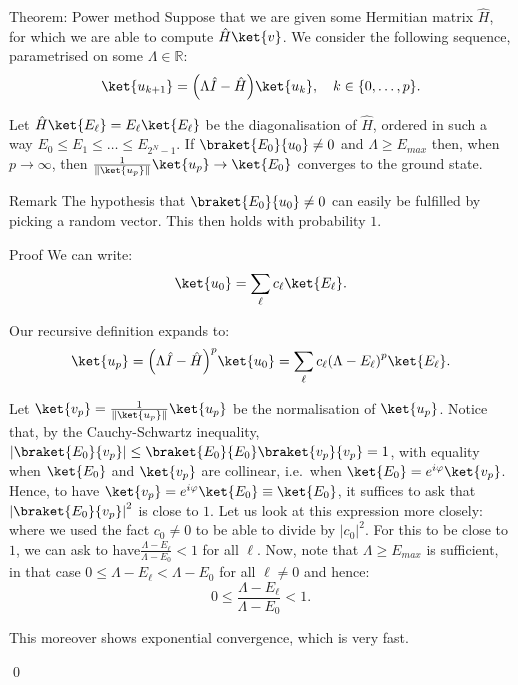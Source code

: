 \documentclass[a4paper]{article}
\begin{document}
\begin{parag}{Theorem: Power method}
    Suppose that we are given some Hermitian matrix $\hat{H}$, for which we are able to compute $\hat{H} \ket{v}$. We consider the following sequence, parametrised on some $\Lambda \in \mathbb{R}$: 
    \[\ket{u_{k+1}} = \left(\Lambda \hat{I} - \hat{H}\right) \ket{u_k}, \mathspace k \in \left\{0, \ldots, p\right\}.\]

    Let $\hat{H} \ket{E_{\ell}} = E_{\ell} \ket{E_{\ell}}$ be the diagonalisation of $\hat{H}$, ordered in such a way $E_0 \leq E_1 \leq \ldots \leq E_{2^N - 1}$. If $\braket{E_0}{u_0} \neq 0$ and $\Lambda \geq E_{max}$ then, when $p \to \infty$, then $\frac{1}{\left\|\ket{u_p}\right\|}\ket{u_p} \to \ket{E_0}$ converges to the ground state.

    \begin{subparag}{Remark}
        The hypothesis that $\braket{E_0}{u_0} \neq 0$ can easily be fulfilled by picking a random vector. This then holds with probability $1$.
    \end{subparag}

    \begin{subparag}{Proof}
        We can write: 
        \[\ket{u_0} = \sum_{\ell} c_{\ell} \ket{E_{\ell}}.\]
        
        Our recursive definition expands to: 
        \[\ket{u_p} = \left(\Lambda \hat{I} - \hat{H}\right)^p \ket{u_0} = \sum_{\ell} c_{\ell} \left(\Lambda - E_{\ell}\right)^p \ket{E_{\ell}}.\]
        
        Let $\ket{v_p} = \frac{1}{\left\|\ket{u_p}\right\|} \ket{u_p}$ be the normalisation of $\ket{u_p}$. Notice that, by the Cauchy-Schwartz inequality, $\left|\braket{E_0}{v_p}\right| \leq \braket{E_0}{E_0} \braket{v_p}{v_p} = 1$, with equality when $\ket{E_0}$ and $\ket{v_p}$ are collinear, i.e.~when $\ket{E_0} = e^{i\phi} \ket{v_p}$. Hence, to have $\ket{v_p} = e^{i\phi} \ket{E_0} \equiv \ket{E_0}$, it suffices to ask that $\left|\braket{E_0}{v_p}\right|^2$ is close to $1$. Let us look at this expression more closely:
        where we used the fact $c_0 \neq 0$ to be able to divide by $\left|c_0\right|^2$. For this to be close to $1$, we can ask to have$\frac{\Lambda - E_{\ell}}{\Lambda - E_0} < 1$ for all $\ell$. Now, note that $\Lambda \geq E_{max}$ is sufficient, in that case $0 \leq \Lambda - E_{\ell} < \Lambda - E_0$ for all $\ell \neq 0$ and hence: 
        \[0 \leq \frac{\Lambda - E_{\ell}}{\Lambda - E_0} < 1.\]
        
        This moreover shows exponential convergence, which is very fast.

        \qed
    \end{subparag}
\end{parag}
\end{document}
